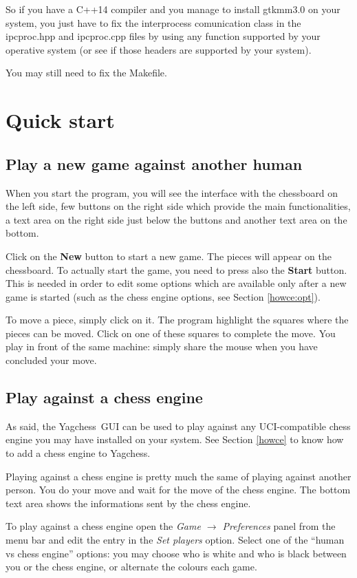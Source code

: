 \documentclass[a4paper]{article}
\newcommand{\nameprog}{Yagchess}
\begin{document}
So if you have a C++14 compiler and you manage to install gtkmm3.0 on your system, you just have to fix the interprocess comunication class in the
ipcproc.hpp and ipcproc.cpp files by using any function supported by your operative system (or see if those headers are supported by your system).

You may still need to fix the Makefile.


\section{Quick start}
\label{quick}
\subsection{Play a new game against another human}
When you start the program, you will see the interface with the chessboard on the left side, few buttons on the right side which provide the main functionalities,
a text area on the right side just below the buttons and another text area on the bottom.

Click on the \textbf{New} button to start a new game. The pieces will appear on the chessboard. To actually start the game, you need to press also the \textbf{Start} button.
This is needed in order to edit some options which are available only after a new game is started (such as the chess engine options, see Section \ref{howce:opt}).

To move a piece, simply click on it. The program highlight the squares where the pieces can be moved. Click on one of these squares to complete the move.
You play in front of the same machine: simply share the mouse when you have concluded your move.


\subsection{Play against a chess engine}
As said, the \nameprog\ GUI can be used to play against any UCI-compatible chess engine you may have installed on your system. See
Section \ref{howce} to know how to add a chess engine to \nameprog.

Playing against a chess engine is pretty much the same of playing against another person. You do your move and wait for the move of the chess engine.
The bottom text area shows the informations sent by the chess engine.

To play against a chess engine open the \textit{Game $\rightarrow$ Preferences} panel from the menu bar and edit the entry in the \textit{Set players} option. Select one of
the ``human vs chess engine'' options: you may choose who is white and who is black between you or the chess engine, or alternate the colours each game.
\end{document}
